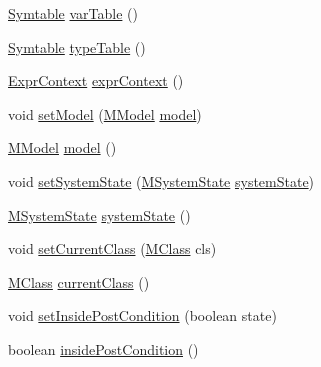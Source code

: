 \begin{DoxyCompactItemize}
\item 
\hyperlink{classorg_1_1tzi_1_1use_1_1parser_1_1_symtable}{Symtable} \hyperlink{classorg_1_1tzi_1_1use_1_1parser_1_1_context_ac3c5ca439a1b5b2af819f66b65e0d3dc}{var\-Table} ()
\item 
\hyperlink{classorg_1_1tzi_1_1use_1_1parser_1_1_symtable}{Symtable} \hyperlink{classorg_1_1tzi_1_1use_1_1parser_1_1_context_a2898c7dff098a665371ecd0b6499ec26}{type\-Table} ()
\item 
\hyperlink{classorg_1_1tzi_1_1use_1_1parser_1_1_expr_context}{Expr\-Context} \hyperlink{classorg_1_1tzi_1_1use_1_1parser_1_1_context_a41a6c6e6f590b9f398448ccd18513917}{expr\-Context} ()
\item 
void \hyperlink{classorg_1_1tzi_1_1use_1_1parser_1_1_context_a398fc29e956919f303a4e3c517bd5ce3}{set\-Model} (\hyperlink{classorg_1_1tzi_1_1use_1_1uml_1_1mm_1_1_m_model}{M\-Model} \hyperlink{classorg_1_1tzi_1_1use_1_1parser_1_1_context_a8ce57f8b381b567c33a0836b234ef114}{model})
\item 
\hyperlink{classorg_1_1tzi_1_1use_1_1uml_1_1mm_1_1_m_model}{M\-Model} \hyperlink{classorg_1_1tzi_1_1use_1_1parser_1_1_context_a8ce57f8b381b567c33a0836b234ef114}{model} ()
\item 
void \hyperlink{classorg_1_1tzi_1_1use_1_1parser_1_1_context_adf349207ebeaf12607dca94f01a58f7f}{set\-System\-State} (\hyperlink{classorg_1_1tzi_1_1use_1_1uml_1_1sys_1_1_m_system_state}{M\-System\-State} \hyperlink{classorg_1_1tzi_1_1use_1_1parser_1_1_context_a3bb781673e56ca82609781761fbde01b}{system\-State})
\item 
\hyperlink{classorg_1_1tzi_1_1use_1_1uml_1_1sys_1_1_m_system_state}{M\-System\-State} \hyperlink{classorg_1_1tzi_1_1use_1_1parser_1_1_context_a3bb781673e56ca82609781761fbde01b}{system\-State} ()
\item 
void \hyperlink{classorg_1_1tzi_1_1use_1_1parser_1_1_context_a87289caaa67e0c522821b8df0b28e4f1}{set\-Current\-Class} (\hyperlink{interfaceorg_1_1tzi_1_1use_1_1uml_1_1mm_1_1_m_class}{M\-Class} cls)
\item 
\hyperlink{interfaceorg_1_1tzi_1_1use_1_1uml_1_1mm_1_1_m_class}{M\-Class} \hyperlink{classorg_1_1tzi_1_1use_1_1parser_1_1_context_a76f29c06d3d4385132590274ea93d449}{current\-Class} ()
\item 
void \hyperlink{classorg_1_1tzi_1_1use_1_1parser_1_1_context_a5853478f05cb636236f9a40ec22f36e2}{set\-Inside\-Post\-Condition} (boolean state)
\item 
boolean \hyperlink{classorg_1_1tzi_1_1use_1_1parser_1_1_context_a30580fe1e965b533bbd82fed489bd266}{inside\-Post\-Condition} ()

\end{DoxyCompactItemize}
